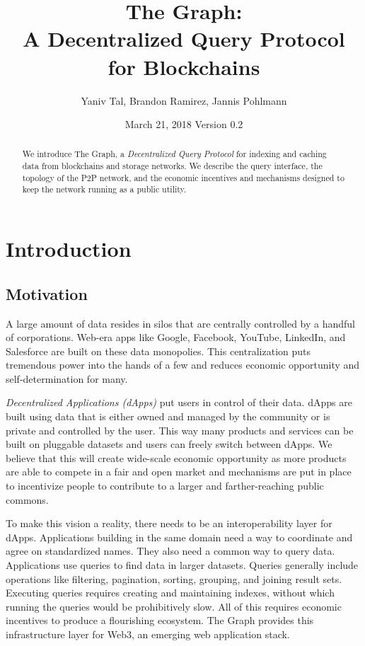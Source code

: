 \documentclass[12pt]{article}
\title{The Graph: \protect\\ A Decentralized Query Protocol for Blockchains}
\author{Yaniv Tal, Brandon Ramirez, Jannis Pohlmann}
\date{March 21, 2018
\endgraf\bigskip Version 0.2}
\begin{document}
\maketitle

\begin{abstract}
  \noindent
  We introduce The Graph, a \textit{Decentralized Query Protocol} for indexing
  and caching data from blockchains and storage networks. We describe the query
  interface, the topology of the P2P network, and the economic incentives and
  mechanisms designed to keep the network running as a public utility.
\end{abstract}

\section{Introduction}

\subsection{Motivation}
A large amount of data resides in silos that are centrally controlled by a
handful of corporations. Web-era apps like Google, Facebook, YouTube, LinkedIn,
and Salesforce are built on these data monopolies. This centralization puts
tremendous power into the hands of a few and reduces economic opportunity and
self-determination for many.

\textit{Decentralized Applications (dApps)} put users in control of their data.
dApps are built using data that is either owned and managed by the community or
is private and controlled by the user. This way many products and services can
be built on pluggable datasets and users can freely switch between dApps. We
believe that this will create wide-scale economic opportunity as more products
are able to compete in a fair and open market and mechanisms are put in place to
incentivize people to contribute to a larger and farther-reaching public
commons.

To make this vision a reality, there needs to be an interoperability layer for
dApps. Applications building in the same domain need a way to coordinate and
agree on standardized names. They also need a common way to query data.
Applications use queries to find data in larger datasets. Queries generally
include operations like filtering, pagination, sorting, grouping, and joining
result sets. Executing queries requires creating and maintaining indexes,
without which running the queries would be prohibitively slow. All of this
requires economic incentives to produce a flourishing ecosystem. The Graph
provides this infrastructure layer for Web3, an emerging web application stack.
\end{document}
